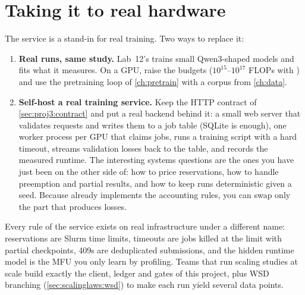 \section{Taking it to real hardware}\label{sec:proj3:real}

The service is a stand-in for real training. Two ways to replace it:
\begin{enumerate}
\item \textbf{Real runs, same study.} Lab~12's  trains small Qwen3-shaped
      models and fits what it measures. On a GPU, raise the budgets
      ($10^{15}$--$10^{17}$ FLOPs with ) and use the pretraining loop of
      \cref{ch:pretrain} with a corpus from \cref{ch:data}.
\item \textbf{Self-host a real training service.} Keep the HTTP contract of
      \cref{sec:proj3:contract} and put a real backend behind it: a small web server that
      validates requests and writes them to a job table (SQLite is enough), one worker process per
      GPU that claims jobs, runs a training script with a hard timeout, streams validation losses
      back to the table, and records the measured runtime. The interesting systems questions are
      the ones you have just been on the other side of: how to price reservations, how to
      handle preemption and partial results, and how to keep runs deterministic given a seed.
      Because  already implements the accounting rules, you can swap
      only the part that produces losses.
\end{enumerate}

\begin{systemslens}
Every rule of the service exists on real infrastructure under a different name: reservations
are Slurm time limits, timeouts are jobs killed at the limit with partial checkpoints, 409s are
deduplicated submissions, and the hidden runtime model is the MFU you only learn by profiling.
Teams that run scaling studies at scale build exactly the client, ledger and gates of this
project, plus WSD branching (\cref{sec:scalinglaws:wsd}) to make each run yield several
data points.
\end{systemslens}
